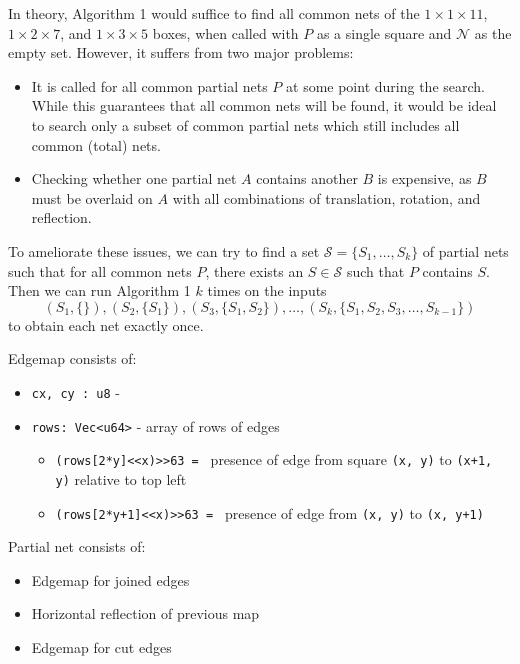 \documentclass{article}
\begin{document}
In theory, Algorithm 1 would suffice to find all common nets of the
$1 \times 1 \times 11$, $1 \times 2 \times 7$, and $1 \times 3 \times 5$ boxes,
when called with $P$ as a single square and $\mathcal{N}$ as the empty set.
However, it suffers from two major problems:
\begin{itemize}
\item
  It is called for all common partial nets $P$ at some point during the search.
  While this guarantees that all common nets will be found,
  it would be ideal to search only a subset of common partial nets
  which still includes all common (total) nets.
\item
  Checking whether one partial net $A$ contains another $B$ is expensive,
  as $B$ must be overlaid on $A$
  with all combinations of translation, rotation, and reflection.
\end{itemize}
To ameliorate these issues,
we can try to find a set $\mathcal{S} = \{S_1, \ldots, S_k\}$ of partial nets
such that for all common nets $P$,
there exists an $S \in \mathcal{S}$ such that $P$ contains $S$.
Then we can run Algorithm 1 $k$ times on the inputs
\[
(S_1, \{\}), (S_2, \{S_1\}), (S_3, \{S_1, S_2\}), \ldots,
(S_k, \{S_1, S_2, S_3, \ldots, S_{k-1}\})
\]
to obtain each net exactly once.

\newpage

\newcommand{\code}{\texttt}

Edgemap consists of:
\begin{itemize}
\item
  \code{cx, cy : u8} - 
\item
  \code{rows: Vec<u64>} - array of rows of edges
  \begin{itemize}
  \item
    \code{(rows[2*y]<<x)>>63 = } presence of edge
    from square \code{(x, y)} to \code{(x+1, y)} relative to top left
  \item
    \code{(rows[2*y+1]<<x)>>63 = } presence of edge
    from \code{(x, y)} to \code{(x, y+1)}
  \end{itemize}
\end{itemize}

Partial net consists of:
\begin{itemize}
\item
  Edgemap for joined edges
\item
  Horizontal reflection of previous map
\item
  Edgemap for cut edges
\end{itemize}
\end{document}
